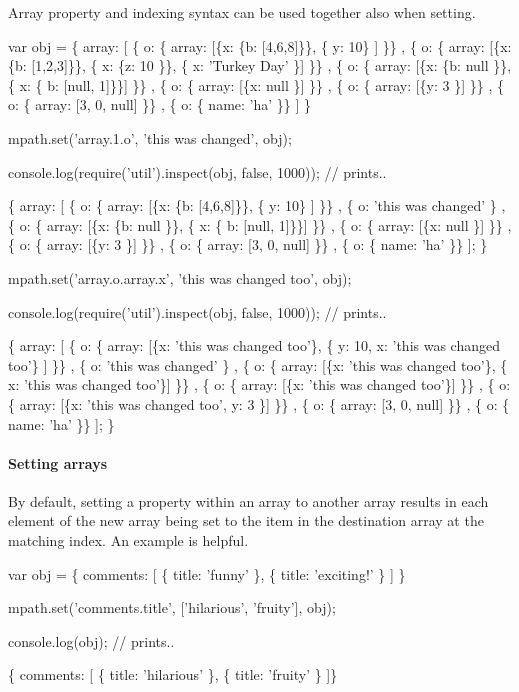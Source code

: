 Array property and indexing syntax can be used together also when setting.


\begin{DoxyCode}
var obj = \{
  array: [
      \{ o: \{ array: [\{x: \{b: [4,6,8]\}\}, \{ y: 10\} ] \}\}
    , \{ o: \{ array: [\{x: \{b: [1,2,3]\}\}, \{ x: \{z: 10 \}\}, \{ x: 'Turkey Day' \}] \}\}
    , \{ o: \{ array: [\{x: \{b: null \}\}, \{ x: \{ b: [null, 1]\}\}] \}\}
    , \{ o: \{ array: [\{x: null \}] \}\}
    , \{ o: \{ array: [\{y: 3 \}] \}\}
    , \{ o: \{ array: [3, 0, null] \}\}
    , \{ o: \{ name: 'ha' \}\}
  ]
\}

mpath.set('array.1.o', 'this was changed', obj);

console.log(require('util').inspect(obj, false, 1000)); // prints..

\{
  array: [
      \{ o: \{ array: [\{x: \{b: [4,6,8]\}\}, \{ y: 10\} ] \}\}
    , \{ o: 'this was changed' \}
    , \{ o: \{ array: [\{x: \{b: null \}\}, \{ x: \{ b: [null, 1]\}\}] \}\}
    , \{ o: \{ array: [\{x: null \}] \}\}
    , \{ o: \{ array: [\{y: 3 \}] \}\}
    , \{ o: \{ array: [3, 0, null] \}\}
    , \{ o: \{ name: 'ha' \}\}
  ];
\}

mpath.set('array.o.array.x', 'this was changed too', obj);

console.log(require('util').inspect(obj, false, 1000)); // prints..

\{
  array: [
      \{ o: \{ array: [\{x: 'this was changed too'\}, \{ y: 10, x: 'this was changed too'\} ] \}\}
    , \{ o: 'this was changed' \}
    , \{ o: \{ array: [\{x: 'this was changed too'\}, \{ x: 'this was changed too'\}] \}\}
    , \{ o: \{ array: [\{x: 'this was changed too'\}] \}\}
    , \{ o: \{ array: [\{x: 'this was changed too', y: 3 \}] \}\}
    , \{ o: \{ array: [3, 0, null] \}\}
    , \{ o: \{ name: 'ha' \}\}
  ];
\}
\end{DoxyCode}


\paragraph*{Setting arrays}

By default, setting a property within an array to another array results in each element of the new array being set to the item in the destination array at the matching index. An example is helpful.


\begin{DoxyCode}
var obj = \{
    comments: [
      \{ title: 'funny' \},
      \{ title: 'exciting!' \}
    ]
\}

mpath.set('comments.title', ['hilarious', 'fruity'], obj);

console.log(obj); // prints..

  \{ comments: [
      \{ title: 'hilarious' \},
      \{ title: 'fruity' \}
  ]\}
\end{DoxyCode}


